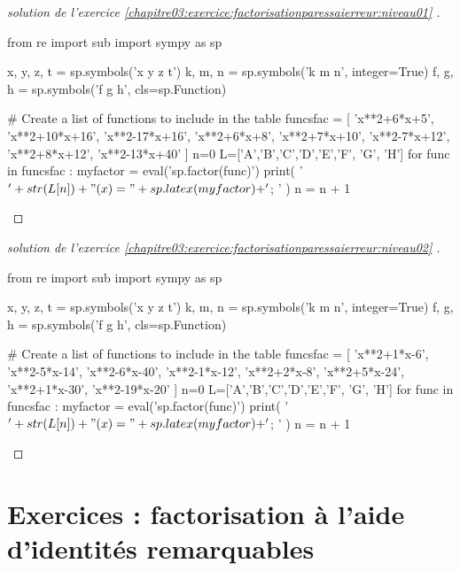 \documentclass[main.tex]{subfiles}
\begin{document}
\vfill 
\begin{proof}[solution de l'exercice \ref{chapitre03:exercice:factorisationparessaierreur:niveau01} ]  \hfill
	
\begin{pycode}
from re import sub
import sympy as sp

x, y, z, t = sp.symbols('x y z t')
k, m, n = sp.symbols('k m n', integer=True)
f, g, h = sp.symbols('f g h', cls=sp.Function)

# Create a list of functions to include in the table
funcsfac = [ 
'x**2+6*x+5',
'x**2+10*x+16',
'x**2-17*x+16',
'x**2+6*x+8',
'x**2+7*x+10', 
'x**2-7*x+12', 
'x**2+8*x+12', 
'x**2-13*x+40'
]
n=0
L=['A','B','C','D','E','F', 'G', 'H']
for func in funcsfac :  
	myfactor =  eval('sp.factor(func)')
	print( '$'+ str(L[n])  + "(x)=" + sp.latex(myfactor) + '$; ' ) 
	n     = n + 1
\end{pycode}
\end{proof}
\begin{proof}[solution de l'exercice \ref{chapitre03:exercice:factorisationparessaierreur:niveau02} ]  \hfill
	
\begin{pycode}
from re import sub
import sympy as sp

x, y, z, t = sp.symbols('x y z t')
k, m, n = sp.symbols('k m n', integer=True)
f, g, h = sp.symbols('f g h', cls=sp.Function)

# Create a list of functions to include in the table
funcsfac = [ 
'x**2+1*x-6',
'x**2-5*x-14',
'x**2-6*x-40',
'x**2-1*x-12',
'x**2+2*x-8', 
'x**2+5*x-24', 
'x**2+1*x-30', 
'x**2-19*x-20'
]
n=0
L=['A','B','C','D','E','F', 'G', 'H']
for func in funcsfac :  
	myfactor =  eval('sp.factor(func)')
	print( '$'+ str(L[n])  + "(x)=" + sp.latex(myfactor) + '$; ' ) 
	n     = n + 1
\end{pycode}
	\end{proof}

%	 
 \newpage 
{}  
\pagestyle{scrheadings} %

\onehalfspacing    
\section{Exercices : factorisation à l'aide d'identités remarquables}
 
\end{document}
